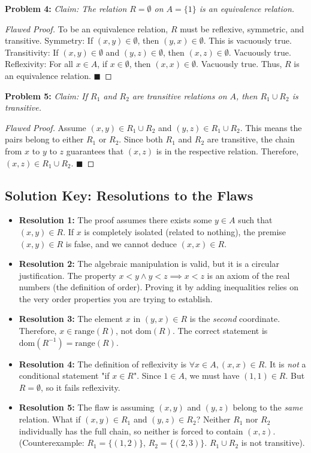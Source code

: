\documentclass[11pt, a4paper]{article}
\theoremstyle{definition}
\theoremstyle{remark}
\newcommand{\dom}{\text{dom}}
\newcommand{\range}{\text{range}}
\begin{document}
\textbf{Problem 4:} \textit{Claim: The relation $R = \emptyset$ on $A = \{1\}$ is an equivalence relation.}
\begin{proof}[Flawed Proof]
To be an equivalence relation, $R$ must be reflexive, symmetric, and transitive. 
Symmetry: If $(x, y) \in \emptyset$, then $(y, x) \in \emptyset$. This is vacuously true.
Transitivity: If $(x, y) \in \emptyset$ and $(y, z) \in \emptyset$, then $(x, z) \in \emptyset$. Vacuously true.
Reflexivity: For all $x \in A$, if $x \in \emptyset$, then $(x, x) \in \emptyset$. Vacuously true.
Thus, $R$ is an equivalence relation. $\blacksquare$
\end{proof}

\textbf{Problem 5:} \textit{Claim: If $R_1$ and $R_2$ are transitive relations on $A$, then $R_1 \cup R_2$ is transitive.}
\begin{proof}[Flawed Proof]
Assume $(x, y) \in R_1 \cup R_2$ and $(y, z) \in R_1 \cup R_2$. This means the pairs belong to either $R_1$ or $R_2$. Since both $R_1$ and $R_2$ are transitive, the chain from $x$ to $y$ to $z$ guarantees that $(x, z)$ is in the respective relation. Therefore, $(x, z) \in R_1 \cup R_2$. $\blacksquare$
\end{proof}

\vspace{2em}
\subsection*{Solution Key: Resolutions to the Flaws}
\begin{itemize}
    \item \textbf{Resolution 1:} The proof assumes there exists some $y \in A$ such that $(x, y) \in R$. If $x$ is completely isolated (related to nothing), the premise $(x, y) \in R$ is false, and we cannot deduce $(x, x) \in R$.
    \item \textbf{Resolution 2:} The algebraic manipulation is valid, but it is a circular justification. The property $x < y \land y < z \implies x < z$ is an axiom of the real numbers (the definition of order). Proving it by adding inequalities relies on the very order properties you are trying to establish.
    \item \textbf{Resolution 3:} The element $x$ in $(y, x) \in R$ is the \textit{second} coordinate. Therefore, $x \in \range(R)$, not $\dom(R)$. The correct statement is $\dom(R^{-1}) = \range(R)$.
    \item \textbf{Resolution 4:} The definition of reflexivity is $\forall x \in A, (x, x) \in R$. It is \textit{not} a conditional statement "if $x \in R$". Since $1 \in A$, we must have $(1, 1) \in R$. But $R = \emptyset$, so it fails reflexivity.
    \item \textbf{Resolution 5:} The flaw is assuming $(x, y)$ and $(y, z)$ belong to the \textit{same} relation. What if $(x, y) \in R_1$ and $(y, z) \in R_2$? Neither $R_1$ nor $R_2$ individually has the full chain, so neither is forced to contain $(x, z)$. (Counterexample: $R_1 = \{(1,2)\}$, $R_2 = \{(2,3)\}$. $R_1 \cup R_2$ is not transitive).
\end{itemize}
\end{document}
